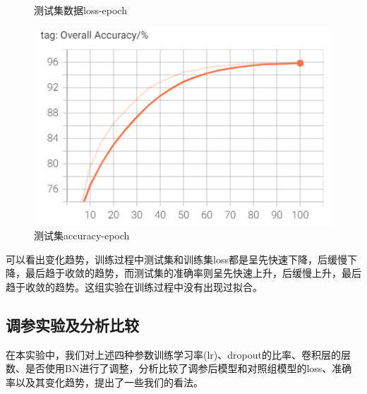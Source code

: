 \documentclass[11pt]{article}
\begin{document}
\begin{figure}[h]
\begin{minipage}[t]{0.3\textwidth}
\caption{测试集数据loss-epoch}
\end{minipage}
\begin{minipage}[t]{0.3\textwidth}%
\centering
\includegraphics[scale=0.6]{images/accuracy.png}
\caption{测试集accuracy-epoch}
\end{minipage}
\end{figure}
可以看出变化趋势，训练过程中测试集和训练集loss都是呈先快速下降，后缓慢下降，最后趋于收敛的趋势，而测试集的准确率则呈先快速上升，后缓慢上升，最后趋于收敛的趋势。这组实验在训练过程中没有出现过拟合。
\subsection{调参实验及分析比较}
在本实验中，我们对上述四种参数训练学习率(lr)、dropout的比率、卷积层的层数、是否使用BN进行了调整，分析比较了调参后模型和对照组模型的loss、准确率以及其变化趋势，提出了一些我们的看法。\par
\end{document}
